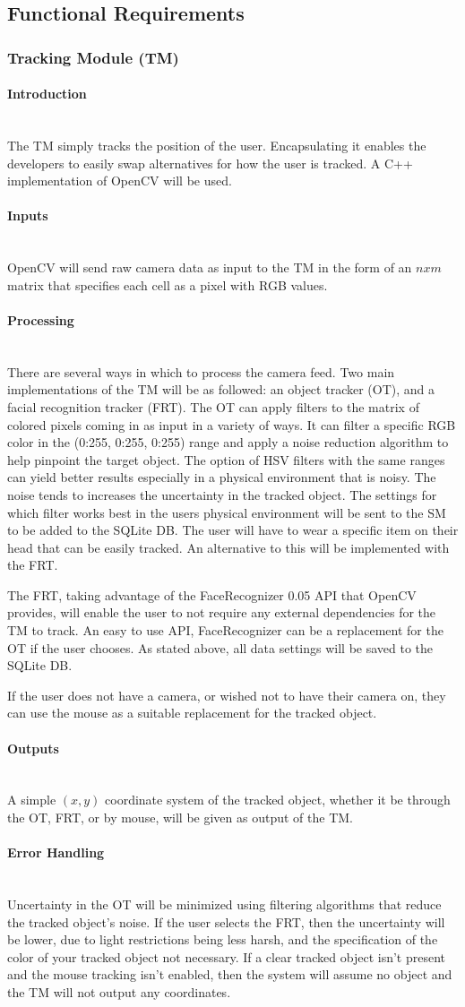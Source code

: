 \documentclass[titlepage]{article}
\newcommand{\myparagraph}[1]{\paragraph{#1}\mbox{}\\}
\begin{document}
\subsection{Functional Requirements}
\subsubsection{Tracking Module (TM)}

\myparagraph{Introduction}
The TM simply tracks the position of the user. Encapsulating it enables the developers to easily swap alternatives for how the user is tracked. A C++ implementation of OpenCV will be used.

\myparagraph{Inputs}
OpenCV will send raw camera data as input to the TM in the form of an $nxm$ matrix that specifies each cell as a pixel with RGB values.

\myparagraph{Processing}
There are several ways in which to process the camera feed. Two main implementations of the TM will be as followed: an object tracker (OT), and a facial recognition tracker (FRT). The OT can apply filters to the matrix of colored pixels coming in as input in a variety of ways. It can filter a specific RGB color in the (0:255, 0:255, 0:255) range and apply a noise reduction algorithm to help pinpoint the target object. The option of HSV filters with the same ranges can yield better results especially in a physical environment that is noisy. The noise tends to increases the uncertainty in the tracked object. The settings for which filter works best in the users physical environment will be sent to the SM to be added to the SQLite DB. The user will have to wear a specific item on their head that can be easily tracked. An alternative to this will be implemented with the FRT.

The FRT, taking advantage of the FaceRecognizer 0.05 API that OpenCV provides, will enable the user to not require any external dependencies for the TM to track. An easy to use API, FaceRecognizer can be a replacement for the OT if the user chooses.  As stated above, all data settings will be saved to the SQLite DB.

If the user does not have a camera, or wished not to have their camera on, they can use the mouse as a suitable replacement for the tracked object. 

\myparagraph{Outputs}
A simple $(x,y)$ coordinate system of the tracked object, whether it be through the OT, FRT, or by mouse, will be given as output of the TM.

\myparagraph{Error Handling}
Uncertainty in the OT will be minimized using filtering algorithms that reduce the tracked object's noise. If the user selects the FRT, then the uncertainty will be lower, due to light restrictions being less harsh, and the specification of the color of your tracked object not necessary. If a clear tracked object isn't present and the mouse tracking isn't enabled, then the system will assume no object and the TM will not output any coordinates.
\end{document}
